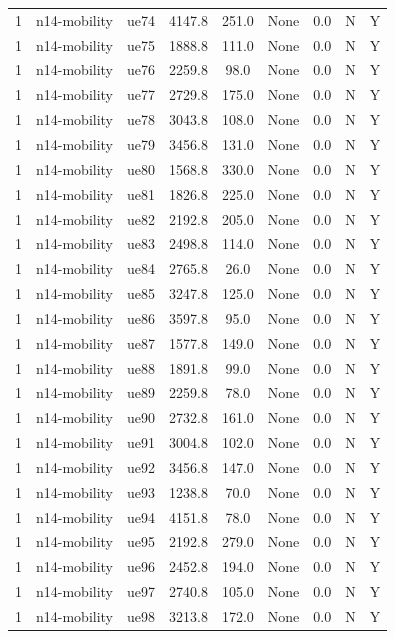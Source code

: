\begin{table}[ht]
\begin{tabular}{|c|c|c|c|c|c|c|c|c|}
1 & n14-mobility & ue74 & 4147.8 & 251.0 & None & 0.0 & N & Y \\
1 & n14-mobility & ue75 & 1888.8 & 111.0 & None & 0.0 & N & Y \\
1 & n14-mobility & ue76 & 2259.8 & 98.0 & None & 0.0 & N & Y \\
1 & n14-mobility & ue77 & 2729.8 & 175.0 & None & 0.0 & N & Y \\
1 & n14-mobility & ue78 & 3043.8 & 108.0 & None & 0.0 & N & Y \\
1 & n14-mobility & ue79 & 3456.8 & 131.0 & None & 0.0 & N & Y \\
1 & n14-mobility & ue80 & 1568.8 & 330.0 & None & 0.0 & N & Y \\
1 & n14-mobility & ue81 & 1826.8 & 225.0 & None & 0.0 & N & Y \\
1 & n14-mobility & ue82 & 2192.8 & 205.0 & None & 0.0 & N & Y \\
1 & n14-mobility & ue83 & 2498.8 & 114.0 & None & 0.0 & N & Y \\
1 & n14-mobility & ue84 & 2765.8 & 26.0 & None & 0.0 & N & Y \\
1 & n14-mobility & ue85 & 3247.8 & 125.0 & None & 0.0 & N & Y \\
1 & n14-mobility & ue86 & 3597.8 & 95.0 & None & 0.0 & N & Y \\
1 & n14-mobility & ue87 & 1577.8 & 149.0 & None & 0.0 & N & Y \\
1 & n14-mobility & ue88 & 1891.8 & 99.0 & None & 0.0 & N & Y \\
1 & n14-mobility & ue89 & 2259.8 & 78.0 & None & 0.0 & N & Y \\
1 & n14-mobility & ue90 & 2732.8 & 161.0 & None & 0.0 & N & Y \\
1 & n14-mobility & ue91 & 3004.8 & 102.0 & None & 0.0 & N & Y \\
1 & n14-mobility & ue92 & 3456.8 & 147.0 & None & 0.0 & N & Y \\
1 & n14-mobility & ue93 & 1238.8 & 70.0 & None & 0.0 & N & Y \\
1 & n14-mobility & ue94 & 4151.8 & 78.0 & None & 0.0 & N & Y \\
1 & n14-mobility & ue95 & 2192.8 & 279.0 & None & 0.0 & N & Y \\
1 & n14-mobility & ue96 & 2452.8 & 194.0 & None & 0.0 & N & Y \\
1 & n14-mobility & ue97 & 2740.8 & 105.0 & None & 0.0 & N & Y \\
1 & n14-mobility & ue98 & 3213.8 & 172.0 & None & 0.0 & N & Y \\

\end{tabular}
\end{table}
